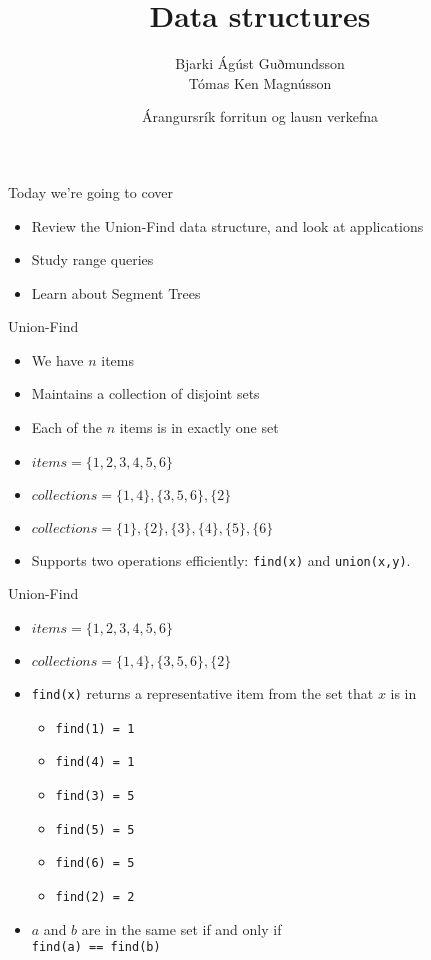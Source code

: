 \documentclass[12pt,t]{beamer}
\title{Data structures}
\author{Bjarki Ágúst Guðmundsson \\ Tómas Ken Magnússon}
\institute{\href{http://ru.is/td}{School of Computer Science} \\[2pt] \href{http://ru.is}{Reykjavík University}}
\date{Árangursrík forritun og lausn verkefna}
\newcommand{\bi}{\begin{itemize}}
\newcommand{\ei}{\end{itemize}}
\begin{document}
{
    \frame{
        \titlepage
    }
}


\begin{frame}{Today we're going to cover}
    \vspace{40pt}
    \bi
        \item Review the Union-Find data structure, and look at applications
        \item Study range queries
        \item Learn about Segment Trees
    \ei
\end{frame}

\begin{frame}[fragile]{Union-Find}
    \vspace{20pt}
    \bi
        \item We have $n$ items
        \item Maintains a collection of disjoint sets
        \item Each of the $n$ items is in exactly one set
        \vspace{10pt}
        \item $items = \{1,2,3,4,5,6\}$
        \item $collections = \{1,4\}, \{3,5,6\}, \{2\}$
        \item $collections = \{1\}, \{2\}, \{3\}, \{4\}, \{5\}, \{6\}$
        \vspace{10pt}
        \item Supports two operations efficiently: \texttt{find(x)} and \texttt{union(x,y)}.
    \ei
\end{frame}

\begin{frame}{Union-Find}
    \bi
        \vspace{10pt}
        \item $items = \{1,2,3,4,5,6\}$
        \item $collections = \{1,4\}, \{3,5,6\}, \{2\}$
        \vspace{10pt}
        \item \texttt{find(x)} returns a representative item from the set that $x$ is in
            \bi
                \vspace{5pt}
                \item \texttt{find(1) = 1}
                \item \texttt{find(4) = 1}
                \vspace{5pt}
                \item \texttt{find(3) = 5}
                \item \texttt{find(5) = 5}
                \item \texttt{find(6) = 5}
                \vspace{5pt}
                \item \texttt{find(2) = 2}
            \ei
        \vspace{5pt}
        \item $a$ and $b$ are in the same set if and only if \\ \texttt{find(a) == find(b)}
    \ei
\end{frame}
\end{document}
